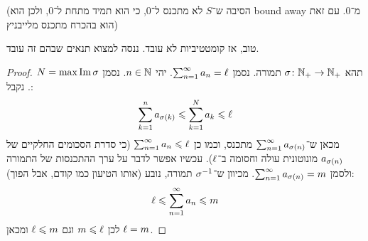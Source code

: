 \documentclass[name=רשימות חשבון דיפרנציאלי ואינטגרלי 1א]{../../../tex/classes/megasumPreamble}
\begin{document}
	(הסיבה ש־$S$ לא מתכנס ל־$0$, כי הוא תמיד מתחת ל־$0$, ולכן הוא bound away מ־$0$. עם זאת הוא בהכרח מתכנס מלייבניץ)

	טוב, אז קומטטיביות לא עובד. ננסה למצוא תנאים שבהם זה עובד.
	\begin{proof}
		תהא $\sigma \colon \mathbb{N}_+ \to \mathbb{N}_+$ תמורה. נסמן $\sum_{n = 1}^{\infty} a_n = \ell$. יהי $n \in \mathbb{N}$. נסמן $N = \max \operatorname{Im} \sigma$. נקבל:
		\[ \sum_{k = 1}^{n} a_{\sigma(k)} \leqslant \sum_{k = 1}^{N} a_k \leqslant \ell \]
		מכאן ש־$\sum_{n = 1}^{\infty} a_{\sigma(n)}$ מתכנס, וכמו כן $\sum_{n = 1}^{\infty} a_n \leqslant \ell$ (כי סדרת הסכומים החלקיים של $a_{\sigma(n)}$ מונוטונית עולה וחסומה ב־$\ell$). עכשיו אפשר לדבר על ערך ההתכנסות של התמורה ולסמן $\sum_{n = 1}^{\infty} a_{\sigma(n)} = m$. מכיוון ש־$\sigma^{-1}$ תמורה, נובע (אותו הטיעון כמו קודם, אבל הפוך):
		\[ \ell \leqslant \sum_{n = 1}^{\infty} a_n \leqslant m \]
		לכן $m \leqslant \ell$ וגם $\ell \leqslant m$ ומכאן $\ell = m$.
	\end{proof}
\end{document}
